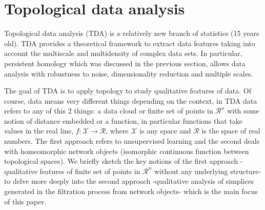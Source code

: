 \documentclass[onecollarge,runningheads]{svjour2}
\begin{document}
\section{Topological data analysis}
\label{se:tda}

Topological data analysis (TDA) is a relatively new branch of statistics (15 years old). TDA provides a theoretical framework to extract data features taking into account the multiscale and multidensity of complex data sets. In particular, persistent homology which was discussed in the previous section, allows data analysis with robustness to noise, dimensionality reduction and multiple scales.

The goal of TDA is to apply topology to study qualitative features of data. Of course, data means very different things depending on the context, in TDA data refers to any of this 2 things: a data cloud or  finite set of points in $\mathcal{R}^n$ with some notion of distance embedded or a function, in particular functions that take values in the real line, $f:\mathcal{X} \to \mathcal{R}$, where $\mathcal{X}$ is any space and $\mathcal{R}$ is the space of real numbers. The first approach refers to unsupervised learning and the second deals with homeomorphic network objects (isomorphic continuous function between topological spaces). We briefly sketch the key notions of the first approach -qualitative features of finite set of points in $\mathcal{R}^n$ without any underlying structure- to delve more deeply into the second approach -qualitative analysis of simplices generated in the filtration process from network objects- which is the main focus of this paper.
\end{document}
